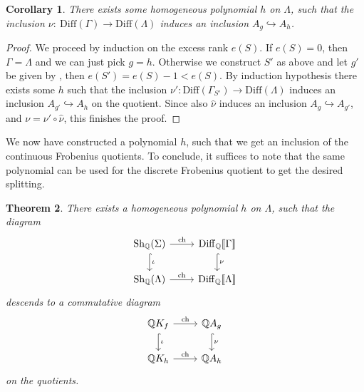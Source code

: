 \documentclass[oneside]{amsart}
\theoremstyle{plain}
\newtheorem{theorem}{Theorem}[section]
\newtheorem{corollary}[theorem]{Corollary}
\theoremstyle{definition}
\newcommand{\Q}{{\mathbb{Q}}}
\newcommand{\Diff}{{\mathrm{Diff}}}
\newcommand{\Sh}{{\mathrm{Sh}}}
\newcommand{\ch}{{\mathrm{ch}}}
\begin{document}
\begin{corollary}\label{cor:h-exists-A_h}
    There exists some homogeneous polynomial $h$ on $\Lambda$, such that the inclusion $\nu:~\Diff(\Gamma) \to \Diff(\Lambda)$ induces an inclusion $A_g \hookrightarrow A_h$.
\end{corollary}

\begin{proof}
    We proceed by induction on the excess rank $e(S)$. If $e(S) = 0$, then $\Gamma = \Lambda$ and we can just pick $g = h$. Otherwise we construct $S'$ as above and let $g'$ be given by , then $e(S') = e(S) - 1 < e(S)$. By induction hypothesis there exists some $h$ such that the inclusion 
     $\nu': \Diff(\Gamma_{S'}) \to \Diff(\Lambda)$ induces an inclusion $A_{g'} \hookrightarrow A_h$ on the quotient.
     Since also $\hat \nu$ induces an inclusion $A_{g} \hookrightarrow A_{g'}$, and $\nu = \nu' \circ \hat\nu$, this finishes the proof.
\end{proof}

We now have constructed a polynomial $h$, such that we get an inclusion of the continuous Frobenius quotients. To conclude, it suffices to note that the same polynomial can be used for the discrete Frobenius quotient to get the desired splitting.

\begin{theorem}
    There exists a homogeneous polynomial $h$ on $\Lambda$, such that the diagram
    \[
    \begin{tikzcd}
    	\Sh_\Q(\Sigma) & \Diff_\Q \llbracket \Gamma \rrbracket\\
    	\Sh_\Q(\Lambda) & \Diff_\Q\llbracket \Lambda \rrbracket
    	\arrow["\ch", from=1-1, to=1-2]
    	\arrow["\iota", hook, from=1-1, to=2-1]
    	\arrow["\nu", hook, from=1-2, to=2-2]
    	\arrow["\ch", from=2-1, to=2-2]
    \end{tikzcd}
    \]
    descends to a commutative diagram
    \[\begin{tikzcd}
    	\Q K_f & \Q A_g \\
    	\Q K_{h} & \Q A_{h}
    	\arrow["\ch", from=1-1, to=1-2]
    	\arrow["\iota", hook, from=1-1, to=2-1]
    	\arrow["\nu", hook, from=1-2, to=2-2]
    	\arrow["\ch", from=2-1, to=2-2]
    \end{tikzcd}\]
    on the quotients.
\end{theorem}
\end{document}
